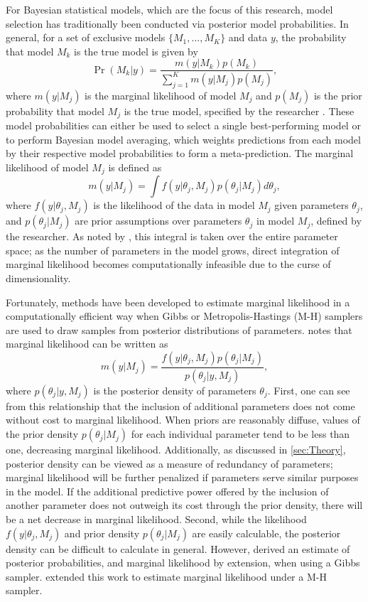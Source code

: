 \documentclass[twocolumn]{article}
\begin{document}
For Bayesian statistical models, which are the focus of this research, model selection has traditionally been conducted via posterior model probabilities. In general, for a set of exclusive models $\{M_1, ..., M_K\}$ and data $y$, the probability that model $M_k$ is the true model is given by
\begin{equation}
	\Pr(M_k|y) = \frac{m(y|M_k)p(M_k)}{\sum_{j=1}^K m(y|M_j)p(M_j)},
\end{equation}
where $m(y|M_j)$ is the marginal likelihood of model $M_j$ and $p(M_j)$ is the prior probability that model $M_j$ is the true model, specified by the researcher \citep{KassRaftery}. These model probabilities can either be used to select a single best-performing model or to perform Bayesian model averaging, which weights predictions from each model by their respective model probabilities to form a meta-prediction. The marginal likelihood of model $M_j$ is defined as
\begin{equation}
m(y|M_j) = \int f(y|\theta_j, M_j) p(\theta_j|M_j)d\theta_j,
\end{equation}
where $f(y|\theta_j, M_j)$ is the likelihood of the data in model $M_j$ given parameters $\theta_j$, and $p(\theta_j|M_j)$ are prior assumptions over parameters $\theta_j$ in model $M_j$, defined by the researcher. As noted by \cite{KassRaftery}, this integral is taken over the entire parameter space; as the number of parameters in the model grows, direct integration of marginal likelihood becomes computationally infeasible due to the curse of dimensionality.

Fortunately, methods have been developed to estimate marginal likelihood in a computationally efficient way when Gibbs or Metropolis-Hastings (M-H) samplers are used to draw samples from posterior distributions of parameters. \cite{Chib} notes that marginal likelihood can be written as 
\begin{equation}
	\label{eq:MLChib}
	m(y|M_j) = \frac{f(y|\theta_j, M_j)p(\theta_j|M_j)}{p(\theta_j|y, M_j)},
\end{equation}
where $p(\theta_j|y, M_j)$ is the posterior density of parameters $\theta_j$. First, one can see from this relationship that the inclusion of additional parameters does not come without cost to marginal likelihood. When priors are reasonably diffuse, values of the prior density $p(\theta_j|M_j)$ for each individual parameter tend to be less than one, decreasing marginal likelihood. Additionally, as discussed in \cref{sec:Theory}, posterior density can be viewed as a measure of redundancy of parameters; marginal likelihood will be further penalized if parameters serve similar purposes in the model. If the additional predictive power offered by the inclusion of another parameter does not outweigh its cost through the prior density, there will be a net decrease in marginal likelihood. Second, while the likelihood $f(y|\theta_j, M_j)$ and prior density $p(\theta_j|M_j)$ are easily calculable, the posterior density can be difficult to calculate in general. However, \cite{Chib} derived an estimate of posterior probabilities, and marginal likelihood by extension, when using a Gibbs sampler. \cite{ChibJeliazkov} extended this work to estimate marginal likelihood under a M-H sampler.
\end{document}

